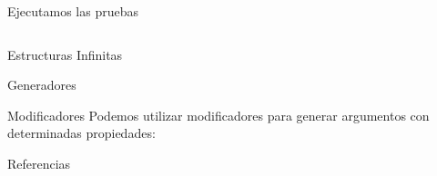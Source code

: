 \documentclass[10pt]{beamer}
\begin{document}
\begin{frame}{Ejecutamos las pruebas}
    \inputminted{text}{data/monitor_test_pruebas.txt}
\end{frame}

\begin{frame}{Estructuras Infinitas}

\end{frame}

\begin{frame}{Generadores}

\end{frame}

\begin{frame}{Modificadores}
  Podemos utilizar modificadores para generar argumentos con
  determinadas propiedades:

\end{frame}

\appendix

\begin{frame}{Referencias}

  
  

\end{frame}
\end{document}
